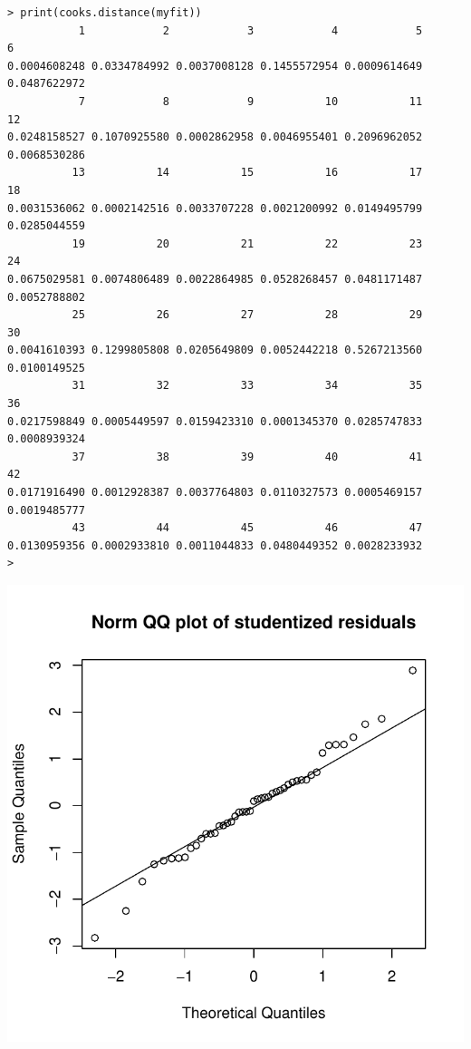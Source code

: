 \documentclass[12pt]{article}
\begin{document}
\begin{verbatim}
> print(cooks.distance(myfit))
           1            2            3            4            5            6 
0.0004608248 0.0334784992 0.0037008128 0.1455572954 0.0009614649 0.0487622972 
           7            8            9           10           11           12 
0.0248158527 0.1070925580 0.0002862958 0.0046955401 0.2096962052 0.0068530286 
          13           14           15           16           17           18 
0.0031536062 0.0002142516 0.0033707228 0.0021200992 0.0149495799 0.0285044559 
          19           20           21           22           23           24 
0.0675029581 0.0074806489 0.0022864985 0.0528268457 0.0481171487 0.0052788802 
          25           26           27           28           29           30 
0.0041610393 0.1299805808 0.0205649809 0.0052442218 0.5267213560 0.0100149525 
          31           32           33           34           35           36 
0.0217598849 0.0005449597 0.0159423310 0.0001345370 0.0285747833 0.0008939324 
          37           38           39           40           41           42 
0.0171916490 0.0012928387 0.0037764803 0.0110327573 0.0005469157 0.0019485777 
          43           44           45           46           47 
0.0130959356 0.0002933810 0.0011044833 0.0480449352 0.0028233932 
> 
\end{verbatim}

\begin{center}
\includegraphics{part13-rstud-qq.pdf}
\end{center}
\end{document}
